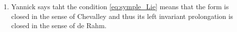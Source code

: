 
\begin{enumerate}
    \item
        Yannick says taht the condition \eqref{eq:symple_Lie} means that the form is closed in the sense of Chevalley and thus its left invariant prolongation is closed in the sense of de Rahm.
\end{enumerate}

